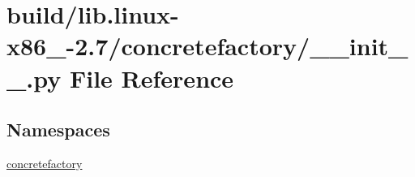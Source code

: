 \hypertarget{build_2lib_8linux-x86__64-2_87_2concretefactory_2____init_____8py}{}\section{build/lib.linux-\/x86\+\_-\/2.7/concretefactory/\+\_\+\+\_\+init\+\_\+\+\_\+.py File Reference}
\label{build_2lib_8linux-x86__64-2_87_2concretefactory_2____init_____8py}
\subsection*{Namespaces}
\begin{DoxyCompactItemize}
\item 
 \hyperlink{namespaceconcretefactory}{concretefactory}
\end{DoxyCompactItemize}

